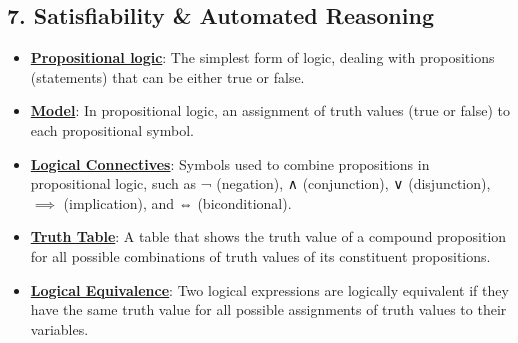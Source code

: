 \documentclass{article}%
\begin{document}
\subsection{7.  Satisfiability \& Automated Reasoning}%
\label{subsec:7.SatisfiabilityAutomatedReasoning}%
\begin{itemize}[leftmargin=*]%
\item \href{https://purdue.brightspace.com/d2l/common/assets/pdfjs-d2l-dist/1.0.14-legacy/web/viewer.html?file=\%2Fcontent\%2Fenforced\%2F1095467-wl.202510.CS.24300.001\%2F13L1-Logic.pdf\%3Fou\%3D1095467\&lang=en-us\&container=d2l-fileviewer-rendered-pdf\&fullscreen=d2l-fileviewer-rendered-pdf-dialog\&height=667#page=8}{\textbf{Propositional logic}}: The simplest form of logic, dealing with propositions (statements) that can be either true or false.%
\item \href{https://purdue.brightspace.com/d2l/common/assets/pdfjs-d2l-dist/1.0.14-legacy/web/viewer.html?file=\%2Fcontent\%2Fenforced\%2F1095467-wl.202510.CS.24300.001\%2F13L1-Logic.pdf\%3Fou\%3D1095467\&lang=en-us\&container=d2l-fileviewer-rendered-pdf\&fullscreen=d2l-fileviewer-rendered-pdf-dialog\&height=667#page=9}{\textbf{Model}}: In propositional logic, an assignment of truth values (true or false) to each propositional symbol.%
\item \href{https://purdue.brightspace.com/d2l/common/assets/pdfjs-d2l-dist/1.0.14-legacy/web/viewer.html?file=\%2Fcontent\%2Fenforced\%2F1095467-wl.202510.CS.24300.001\%2F13L1-Logic.pdf\%3Fou\%3D1095467\&lang=en-us\&container=d2l-fileviewer-rendered-pdf\&fullscreen=d2l-fileviewer-rendered-pdf-dialog\&height=667#page=8}{\textbf{Logical Connectives}}: Symbols used to combine propositions in propositional logic, such as ¬ (negation), ∧ (conjunction), ∨ (disjunction), $\implies$ (implication), and ⇔ (biconditional).%
\item \href{https://purdue.brightspace.com/d2l/common/assets/pdfjs-d2l-dist/1.0.14-legacy/web/viewer.html?file=\%2Fcontent\%2Fenforced\%2F1095467-wl.202510.CS.24300.001\%2F13L1-Logic.pdf\%3Fou\%3D1095467\&lang=en-us\&container=d2l-fileviewer-rendered-pdf\&fullscreen=d2l-fileviewer-rendered-pdf-dialog\&height=667#page=10}{\textbf{Truth Table}}: A table that shows the truth value of a compound proposition for all possible combinations of truth values of its constituent propositions.%
\item \href{https://purdue.brightspace.com/d2l/common/assets/pdfjs-d2l-dist/1.0.14-legacy/web/viewer.html?file=\%2Fcontent\%2Fenforced\%2F1095467-wl.202510.CS.24300.001\%2F13L1-Logic.pdf\%3Fou\%3D1095467\&lang=en-us\&container=d2l-fileviewer-rendered-pdf\&fullscreen=d2l-fileviewer-rendered-pdf-dialog\&height=667#page=12}{\textbf{Logical Equivalence}}: Two logical expressions are logically equivalent if they have the same truth value for all possible assignments of truth values to their variables.%

\end{itemize}
\end{document}
